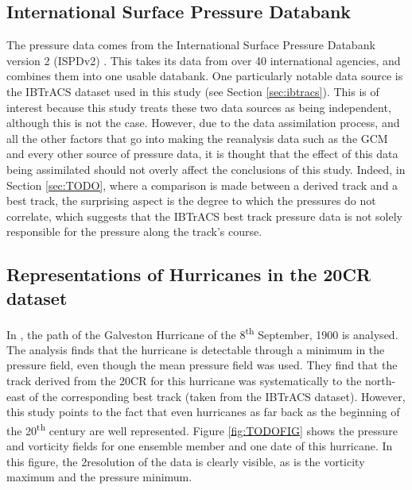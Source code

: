 \documentclass[pdftex,12pt,a4paper]{report}
\newcommand{\ts}{\textsuperscript}
\begin{document}
\subsection{International Surface Pressure Databank}
The pressure data comes from the International Surface Pressure Databank version 2 (ISPDv2)
\parencite{TODOCITE}. This takes its data from over 40 international agencies, and combines them
into one usable databank. One particularly notable data source is the IBTrACS dataset used in this
study (see Section \ref{sec:ibtracs}). This is of interest because this study treats these two data
sources as being independent, although this is not the case. However, due to the data assimilation
process, and all the other factors that go into making the reanalysis data such as the GCM and every
other source of pressure data, it is thought that the effect of this data being assimilated should
not overly affect the conclusions of this study. Indeed, in Section \ref{sec:TODO}, where a
comparison is made between a derived track and a best track, the surprising aspect is the degree to
which the pressures do not correlate, which suggests that the IBTrACS best track pressure data is
not solely responsible for the pressure along the track's course.


\subsection{Representations of Hurricanes in the 20CR dataset}

In \textcite{neff2013}, the path of the Galveston Hurricane of the 8\ts{th} September, 1900 is
analysed. The analysis finds that the hurricane is detectable through a minimum in the pressure
field, even though the mean pressure field was used. They find that the track derived from the 20CR
for this hurricane was systematically to the north-east of the corresponding best track (taken from
the IBTrACS dataset). However, this study points to the fact that even hurricanes as far back as the
beginning of the 20\ts{th} century are well represented. Figure \ref{fig:TODOFIG} shows the pressure
and vorticity fields for one ensemble member and one date of this hurricane. In this figure, the
2\textdegree resolution of the data is clearly visible, as is the vorticity maximum and the pressure
minimum.

\end{document}
